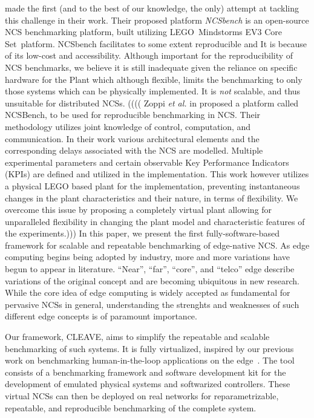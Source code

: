\textcite{Zoppi2020NCSBench} made the first (and to the best of our knowledge, the only) attempt at tackling this challenge in their work.
Their proposed platform \emph{NCSbench} is an open-source \ac{NCS} benchmarking platform, built utilizing LEGO\textregistered{}\ Mindstorms EV3 Core Set\texttrademark{}\ platform. 
NCSbench facilitates to some extent reproducible and It is  because of its low-cost and accessibility. 
Although important for the reproducibility of \ac{NCS} benchmarks, we believe it is still inadequate given the reliance on specific hardware for the Plant which although flexible, limits the benchmarking to only those systems which can be physically implemented.
It is \emph{not} scalable, and thus unsuitable for distributed \acp{NCS}.
(((( Zoppi \textit{et al.} in \cite{9045199} proposed a platform called NCSBench, to be used for reproducible benchmarking in NCS. Their methodology utilizes joint knowledge of control, computation, and communication. In their work various architectural elements and the corresponding delays associated with the NCS are modelled. Multiple experimental parameters and certain observable Key Performance Indicators (KPIs) are defined and utilized in the implementation. This work however utilizes a physical LEGO \cite{lego} based plant for the implementation, preventing instantaneous changes in the plant characteristics and their nature, in terms of flexibility. We overcome this issue by proposing a completely virtual plant allowing for unparalleled flexibility in changing the plant model and characteristic features of the experiments.)))
In this paper, we present the first fully-software-based framework for scalable and repeatable benchmarking of edge-native \ac{NCS}.
As edge computing begins being adopted by industry, more and more variations have begun to appear in literature.
``Near'', ``far'', ``core'', and ``telco'' edge describe variations of the original concept and are becoming ubiquitous in new research.
While the core idea of edge computing is widely accepted as fundamental for pervasive \acp{NCS} in general, understanding the strenghts and weaknesses of such different edge concepts is of paramount importance.

Our framework, \ac{CLEAVE}, aims to simplify the repeatable and scalable benchmarking of such systems.
It is fully virtualized, inspired by our previous work on benchmarking human-in-the-loop applications on the edge~\cite{Olguin2019EdgeDroid}.
The tool consists of a benchmarking framework and software development kit for the development of emulated physical systems and softwarized controllers.
These virtual \acp{NCS} can then be deployed on real networks for reparametrizable, repeatable, and reproducible benchmarking of the complete system.

